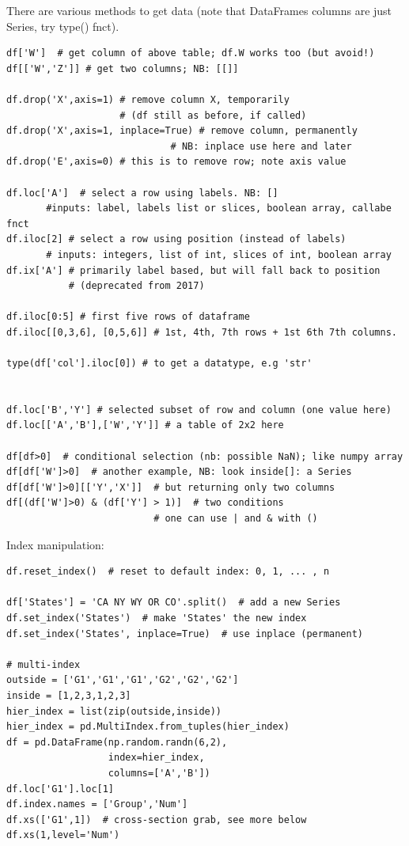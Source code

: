 \documentclass[11pt]{article}
\begin{document}
There are various methods to get data (note that DataFrames columns are just Series, try type() fnct).
\begin{lstlisting}
df['W']  # get column of above table; df.W works too (but avoid!)
df[['W','Z']] # get two columns; NB: [[]]

df.drop('X',axis=1) # remove column X, temporarily 
                    # (df still as before, if called)
df.drop('X',axis=1, inplace=True) # remove column, permanently
                             # NB: inplace use here and later
df.drop('E',axis=0) # this is to remove row; note axis value

df.loc['A']  # select a row using labels. NB: []
	   #inputs: label, labels list or slices, boolean array, callabe fnct
df.iloc[2] # select a row using position (instead of labels)
	   # inputs: integers, list of int, slices of int, boolean array
df.ix['A'] # primarily label based, but will fall back to position
           # (deprecated from 2017)

df.iloc[0:5] # first five rows of dataframe
df.iloc[[0,3,6], [0,5,6]] # 1st, 4th, 7th rows + 1st 6th 7th columns.

type(df['col'].iloc[0]) # to get a datatype, e.g 'str'


df.loc['B','Y'] # selected subset of row and column (one value here)
df.loc[['A','B'],['W','Y']] # a table of 2x2 here

df[df>0]  # conditional selection (nb: possible NaN); like numpy array
df[df['W']>0]  # another example, NB: look inside[]: a Series
df[df['W']>0][['Y','X']]  # but returning only two columns
df[(df['W']>0) & (df['Y'] > 1)]  # two conditions 
                          # one can use | and & with ()
\end{lstlisting}

Index manipulation:
\begin{lstlisting}
df.reset_index()  # reset to default index: 0, 1, ... , n

df['States'] = 'CA NY WY OR CO'.split()  # add a new Series
df.set_index('States')  # make 'States' the new index
df.set_index('States', inplace=True)  # use inplace (permanent)

# multi-index
outside = ['G1','G1','G1','G2','G2','G2']
inside = [1,2,3,1,2,3]
hier_index = list(zip(outside,inside))
hier_index = pd.MultiIndex.from_tuples(hier_index)
df = pd.DataFrame(np.random.randn(6,2),
                  index=hier_index,
                  columns=['A','B'])
df.loc['G1'].loc[1]
df.index.names = ['Group','Num']
df.xs(['G1',1])  # cross-section grab, see more below
df.xs(1,level='Num')
\end{lstlisting}
\end{document}
